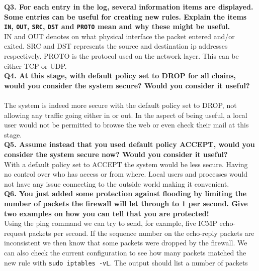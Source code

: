 \noindent \textbf{Q3. For each entry in the log, several information items are
displayed. Some entries can be useful for creating new rules. Explain the 
items \texttt{IN}, \texttt{OUT}, \texttt{SRC}, \texttt{DST} and \texttt{PROTO}
mean and why these might be useful.}
~\ \\

IN and OUT denotes on what physical interface the packet entered and/or exited. SRC and DST represents the source and destination ip addresses respectively. PROTO is the protocol used on the network layer. This can be either TCP or UDP.
~\ \\

\noindent \textbf{Q4. At this stage, with default policy set to DROP for all 
chains, would you consider the system secure? Would you consider it useful?}
~\ \\

The system is indeed more secure with the default policy set to DROP, not allowing any traffic going either in or out. In the aspect of being useful, a local user would not be permitted to browse the web or even check their mail at this stage.
~\ \\

\noindent \textbf{Q5. Assume instead that you used default policy ACCEPT, 
would you consider the system secure now? Would you consider it useful?}
~\ \\

With a default policy set to ACCEPT the system would be less secure. Having no control over who has access or from where. Local users and processes would not have any issue connecting to the outside world making it convenient. 
~\ \\

\noindent \textbf{Q6. You just added some protection against flooding by 
limiting the number of packets the firewall will let through to 1 per second. 
Give two examples on how you can tell that you are protected!}
~\ \\

Using the ping command we can try to send, for example, five ICMP echo-request packets per second. If the sequence number on the echo-reply packets are inconsistent we then know that some packets were dropped by the firewall.
We can also check the current configuration to see how many packets matched the new rule with \texttt{sudo iptables -vL}. The output should list a number of packets
~\ \\
